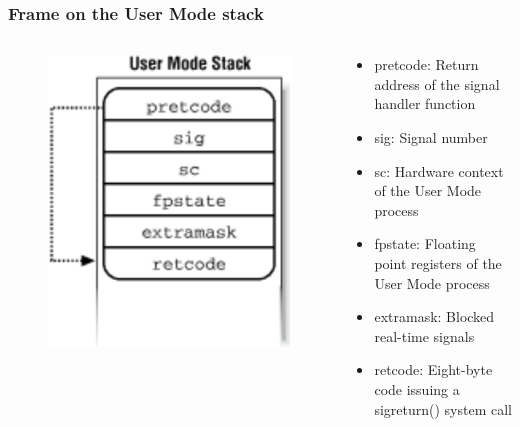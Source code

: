 \begin{frame}[fragile]
    \frametitle{Frame on the User Mode stack}
    \begin{columns}
    \begin{column}{0.5\textwidth}
        \begin{figure}
        \includegraphics[width=0.8\linewidth]{figs/signal-stack-frame.png}
        \end{figure}
	\end{column}
	\begin{column}{0.5\textwidth}
        \begin{itemize}
            \item pretcode: Return address of the signal handler function
            \item sig: Signal number \pause
            \item sc: Hardware context of the User Mode process
            \item fpstate: Floating point registers of the User Mode process
            \item extramask: Blocked real-time signals \pause
            \item retcode: Eight-byte code issuing a sigreturn() system call
        \end{itemize}
    \end{column}
	\end{columns}

\end{frame}
